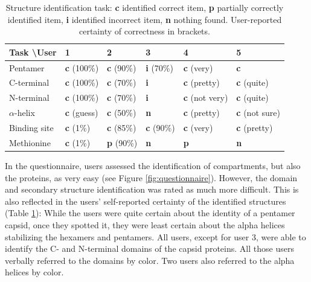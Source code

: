 \documentclass{egpubl}
\begin{document}
	
	
\begin{table}
	 	
	 	\centering
	 	\caption{Structure identification task: \textbf{\color{cc}c} identified correct item, \textbf{\color{cp}p} partially correctly identified item, \textbf{\color{ci}i} identified incorrect item, \textbf{\color{cn}n} nothing found. User-reported certainty of correctness in brackets. }
	 	{\scriptsize \begin{tabular}{ l l l l l l }
	 		\toprule
	 		Task \textbackslash User & 1 & 2 & 3 & 4 & 5 \\
	 		\midrule
	 		Pentamer       & \textbf{\color{cc}c} (100\%) 	& \textbf{\color{cc}c} (90\%) 	& \textbf{\color{ci}i} (70\%) 	& \textbf{\color{cc}c} (very) 		& \textbf{\color{cc}c}\\
	 		C-terminal     & \textbf{\color{cc}c} (100\%) 	& \textbf{\color{cc}c} (70\%) 	& \textbf{\color{ci}i} 		& \textbf{\color{cc}c} (pretty) 	& \textbf{\color{cc}c} (quite) \\
	 		N-terminal     & \textbf{\color{cc}c} (100\%) 	& \textbf{\color{cc}c} (70\%) 	& \textbf{\color{ci}i} 		& \textbf{\color{cc}c} (not very) 	& \textbf{\color{cc}c} (quite)\\
	 		$\alpha$-helix & \textbf{\color{cc}c} (guess) 	& \textbf{\color{cc}c} (50\%) 	& \textbf{\color{cn}n} 		& \textbf{\color{cc}c} (pretty) 	& \textbf{\color{cc}c} (not sure) \\
	 		Binding site   & \textbf{\color{cc}c} (1\%) 	& \textbf{\color{cc}c} (85\%) 	& \textbf{\color{cc}c} (90\%) 	& \textbf{\color{cc}c} (very) 		& \textbf{\color{cc}c} (pretty) \\
	 		Methionine      & \textbf{\color{cc}c} (1\%) 	& \textbf{\color{cp}p} (90\%) 	& \textbf{\color{cn}n} 		& \textbf{\color{cp}p} 			& \textbf{\color{cn}n}  \\
	 		\bottomrule
	 	\end{tabular}}
	 	
	 	\label{table:identification}
	 \end{table}
	 
	 In the questionnaire, users assessed the identification of compartments, but also the proteins, as very easy  (see Figure \ref{fig:questionnaire}). 
	 However, the domain and secondary structure identification was rated as much more difficult. 
	 This is also reflected in the users' self-reported certainty of the identified structures (Table \ref{table:identification}): 
	 While the users were quite certain about the identity of a pentamer capsid, once they spotted it, they were least certain about the alpha helices stabilizing the hexamers and pentamers. 
	 All users, except for user 3, were able to identify the C- and N-terminal domains of the capsid proteins. 
	 All those users verbally referred to the domains by color. 
	 Two users also referred to the alpha helices by color. 
	 
\end{document}
